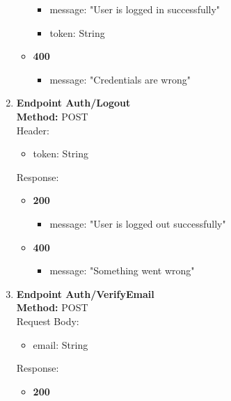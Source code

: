 \begin{enumerate}
\begin{itemize}
        \begin{itemize}
            \item message: "User is logged in successfully"
            \item token: String
        \end{itemize}
                \item \textbf{400} \\
        \begin{itemize}
            \item message: "Credentials are wrong"
        \end{itemize}
    \end{itemize}
    \item \textbf{Endpoint Auth/Logout} \\
    \textbf{Method:} POST \\
    Header:\\
    \begin{itemize}
        \item token: String
    \end{itemize}
    Response:\\
    \begin{itemize}
        \item \textbf{200} \\
        \begin{itemize}
            \item message: "User is logged out successfully"
        \end{itemize}
                \item \textbf{400} \\
        \begin{itemize}
            \item message: "Something went wrong"
        \end{itemize}
    \end{itemize}
    \item \textbf{Endpoint Auth/VerifyEmail} \\
    \textbf{Method:} POST \\
    Request Body:\\
    \begin{itemize}
        \item email: String
    \end{itemize}
    Response:\\
    \begin{itemize}
        \item \textbf{200} \\

\end{itemize}
\end{enumerate}
